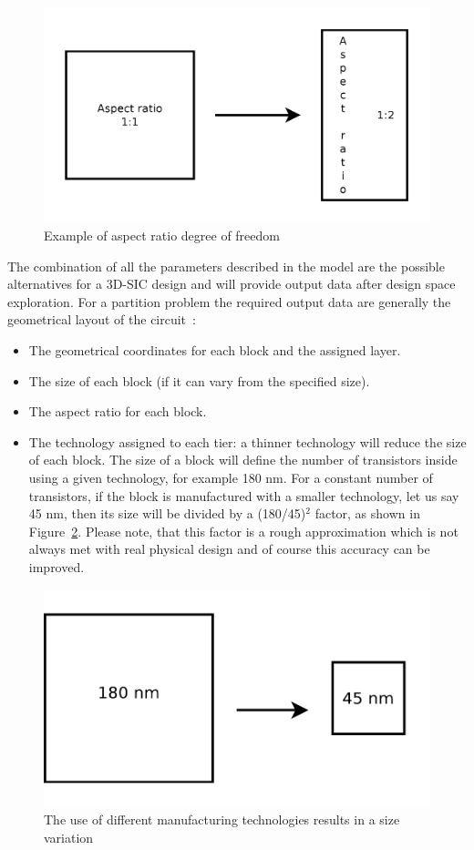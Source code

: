 \begin{figure}[h!]
\begin{center}
\includegraphics[width=0.6\linewidth]{form_factor_ex.pdf}
\end{center}
\vspace{-0.5cm}
\caption{Example of aspect ratio degree of freedom}
\label{fig:ff_ex}
\end{figure}

The combination of all the parameters described in the model are the possible alternatives for a 3D-SIC design and will provide output data after design space exploration. For a partition problem the required output data are generally the geometrical layout of the circuit~\cite{DBLP:conf/3dic/MilojevicCCRRSAPM09}:
\begin{itemize}
\item The geometrical coordinates for each block and the assigned layer.
\item The size of each block (if it can vary from the specified size).
\item The aspect ratio for each block.
\item The technology assigned to each tier: a thinner technology will reduce the size of each block. The size of a block will define the number of transistors inside using a given technology, for example 180 nm. For a constant number of transistors, if the block is manufactured with a smaller technology, let us say 45 nm, then its size will be divided by a (180/45)$^2$ factor, as shown in Figure~\ref{fig:tech_ex}. Please note, that this factor is a rough approximation which is not always met with real physical design and of course this accuracy can be improved.
\end{itemize}

\begin{figure}[h!]
\begin{center}
\includegraphics[width=0.5\linewidth]{tech_ex.pdf}
\end{center}
\vspace{-0.5cm}
\caption{The use of different manufacturing technologies results in a size variation}
\label{fig:tech_ex}
\end{figure}

